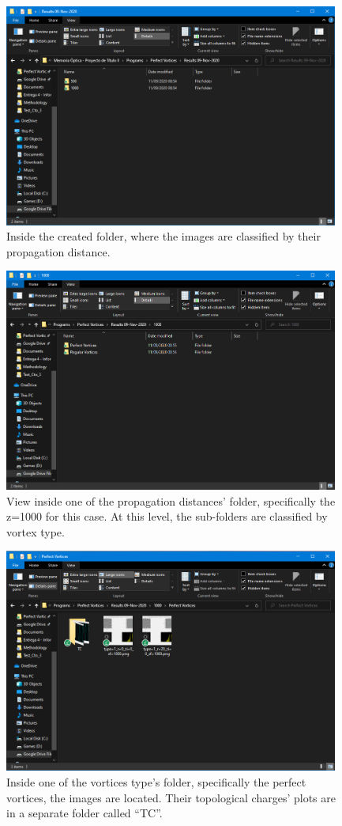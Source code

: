 \begin{figure}[htbp]
    \centering
    \includegraphics[width=11cm]{images/c03/Folder.PNG}
    \caption{Inside the created folder, where the images are classified by their propagation distance.}
    \label{fig:folder}
\end{figure}

\begin{figure}[htbp]
    \centering
    \includegraphics[width=11cm]{images/c03/Specific_folder.PNG}
    \caption{View inside one of the propagation distances' folder, specifically the z=1000 for this case. At this level, the sub-folders are classified by vortex type.}
    \label{fig:specific_folder}
\end{figure}

\begin{figure}[htbp]
    \centering
    \includegraphics[width=11cm]{images/c03/Final_Folder.PNG}
    \caption{Inside one of the vortices type's folder, specifically the perfect vortices, the images are located. Their topological charges' plots are in a separate folder called ``TC''.}
    \label{fig:final_folder}
\end{figure}

